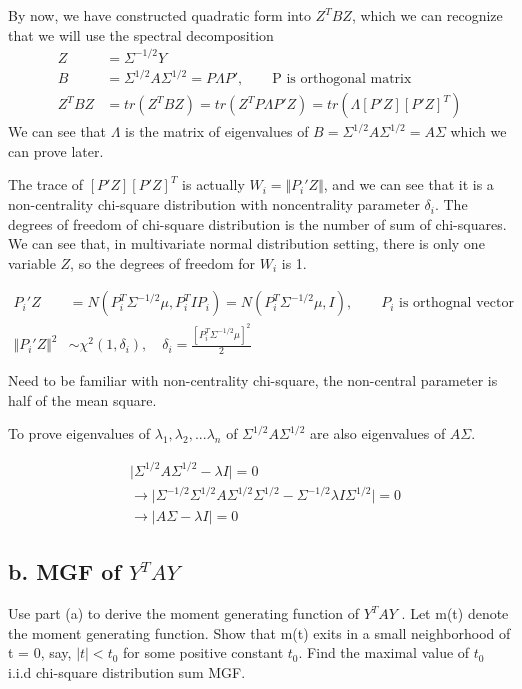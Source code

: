 \documentclass[11pt]{article} %
\begin{document}
By now, we have constructed quadratic form into $Z^T B Z$, which we can recognize that we will use the spectral decomposition
	\begin{align*}
	Z &= \Sigma^{-1/2} Y \\
	B &= \Sigma^{1/2} A \Sigma^{1/2} = P \Lambda P', \qquad \text{P is orthogonal matrix}\\
	Z^T B Z &= tr(Z^T B Z) = tr(Z^T P \Lambda P' Z) = tr(\Lambda [P'Z][P'Z]^T )
\end{align*} 
	We can see that $\Lambda$ is the matrix of eigenvalues of $B= \Sigma^{1/2} A \Sigma^{1/2} = A\Sigma$ which we can prove later. 
	
	The trace of $[P'Z][P'Z]^T $ is actually $W_i = \Vert P_i'Z \Vert$, and we can see that it is a non-centrality chi-square distribution with noncentrality parameter $\delta_i$. The degrees of freedom of chi-square distribution is the number of sum of chi-squares. We can see that, in multivariate normal distribution setting, there is only one variable $Z$, so the degrees of freedom for $W_i$ is 1. 

\begin{align*}
	P_i' Z &= N( P_i^T \Sigma^{-1/2} \mu, P_i^T I P_i) = N( P_i^T \Sigma^{-1/2} \mu, I ), \qquad  P_i \text{ is orthognal vector}\\
	\Vert P_i' Z \Vert^2  & \sim \chi^2 (1, \delta_i), \quad  \delta_i = \frac{[P_i^T \Sigma^{-1/2} \mu]^2}{2} 
\end{align*} 

Need to be familiar with non-centrality chi-square, the non-central parameter is half of the mean square.

To prove eigenvalues of $\lambda_1, \lambda_2, ... \lambda_n$ of $\Sigma^{1/2} A \Sigma^{1/2}$ are also eigenvalues of $A\Sigma$.

\begin{align*}
	& \Big |  \Sigma^{1/2} A \Sigma^{1/2} - \lambda I \Big | = 0\\
	& \rightarrow \Big | \Sigma^{-1/2} \Sigma^{1/2} A \Sigma^{1/2} \Sigma^{1/2} - \Sigma^{-1/2} \lambda I \Sigma^{1/2} \Big | =0 \\
	& \rightarrow \Big |  A \Sigma - \lambda I \Big | = 0
\end{align*} 
 	
	
	\subsection{b. MGF of $Y^TAY$}
	Use part (a) to derive the moment generating function of $Y^TAY$ . Let
	m(t) denote the moment generating function. Show that m(t) exits in a small neighborhood
	of t = 0, say, $|t| < t_0$ for some positive constant $t_0$. Find the maximal value
	of $ t_0$	i.i.d chi-square distribution sum MGF.
	
\end{document}
